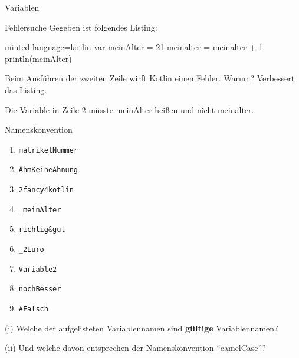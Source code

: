 \begin{task}[points=auto]{Variablen }
    \begin{subtask*}[points=0]{Fehlersuche}
        Gegeben ist folgendes Listing:
        \begin{codeBlock}[]{minted language=kotlin}
            var meinAlter = 21
            meinalter = meinalter + 1
            println(meinAlter)
        \end{codeBlock}
        Beim Ausführen der zweiten Zeile wirft Kotlin einen Fehler. Warum? Verbessert das Listing.
        \begin{solution}
            Die Variable in Zeile 2 müsste {\ttfamily meinAlter} heißen und nicht {\ttfamily meinalter}.
        \end{solution}
    \end{subtask*}
    \begin{subtask*}[points=0]{Namenskonvention}
        \begin{multicols}{3}
            \begin{enumerate}[label=(\alph*)]
                \item \texttt{matrikelNummer}
                \item \texttt{ÄhmKeineAhnung}
                \item \texttt{2fancy4kotlin}
                \item \texttt{_meinAlter}
                \item \texttt{richtig&gut}
                \item \texttt{_2Euro}
                \item \texttt{Variable2}
                \item \texttt{nochBesser}
                \item \texttt{#Falsch}
            \end{enumerate}
        \end{multicols}
        (i) Welche der aufgelisteten Variablennamen sind \textbf{gültige} Variablennamen?

        (ii) Und welche davon entsprechen der Namenskonvention \enquote{camelCase}?
\end{subtask*}
\end{task}
